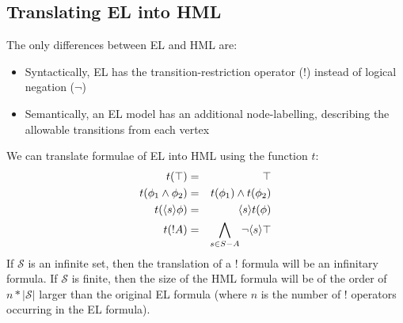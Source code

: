 \subsection{Translating EL into HML}
The only differences between EL and HML are:
\begin{itemize}
\item
Syntactically, EL has the transition-restriction operator ($!$) instead of logical negation ($\neg$)
\item
Semantically, an EL model has an additional node-labelling, describing the allowable transitions from each vertex
\end{itemize}
We can translate formulae of EL into HML using the function $t$:
\begin{eqnarray*}
t(\top) & = & \top  \\
t(\phi_1 \land \phi_2) & = & t(\phi_1) \land t(\phi_2)  \\
t(\langle s \rangle \phi) & = & \langle s \rangle t(\phi)  \\
t(! A) & = & \bigwedge_{s \in S - A} \neg \langle s \rangle \top 
\end{eqnarray*}
If $\mathcal{S}$ is an infinite set, then the translation of a $!$
formula will be an infinitary formula.  If $\mathcal{S}$ is finite,
then the size of the HML formula will be of the order of $n *
|\mathcal{S}|$ larger than the original EL formula (where $n$ is the
number of $!$ operators occurring in the EL formula).

